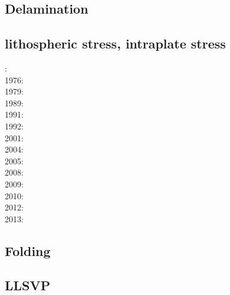 \subsection*{Delamination}

\cite{gopy08}
\cite{vabv10}
\cite{vavg12}
\cite{baeg14}

\subsection*{lithospheric stress, intraplate stress}

: \cite{fouy75}\\
1976: \cite{riso76}\\
1979: \cite{riso79}\\
1989: \cite{boww89}\\
1991: \cite{worg91}\\
1992: \cite{rich92}\cite{wuvr92}\cite{zoba92}\cite{clko92}\\
2001: \cite{stsm01}\\
2004: \cite{ligu04}\\
2005: \cite{timr05}\\
2008: \cite{bilr08}\cite{ghhw08}\\
2009: \cite{ghhf09}\cite{nacl09}\\
2010: \cite{bepo10}\\
2012: \cite{nalr12}\cite{ghho12}\\
2013: \cite{ghhw13}


\subsection*{Folding}

\noindent
\cite{ramb68}
\cite{ramb70}
\cite{ramb71}
\cite{flet91}
\cite{flet95}
\cite{frsc06}
\cite{resb10}
\cite{freh11}
\cite{reds12}\cite{grsc12}
\cite{regc13}
\cite{freh14}\cite{frex14}


\subsection*{LLSVP}


